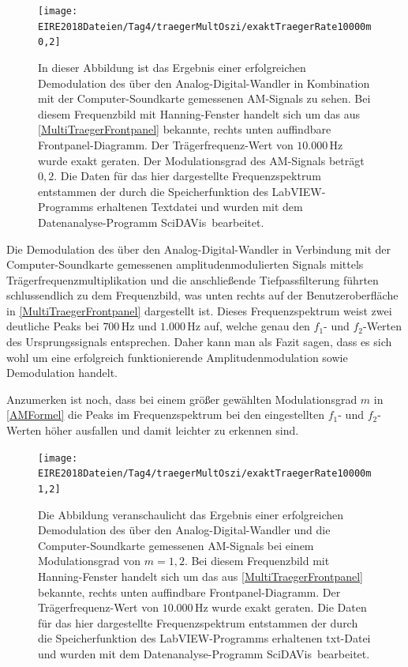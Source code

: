 \documentclass[
a4paper,
12pt,
pagesize,
ngerman
]{scrartcl}
\begin{document}
	\begin{figure}[H]
		\centering
		\texttt{[image: EIRE2018Dateien/Tag4/traegerMultOszi/exaktTraegerRate10000m0,2]}
		\caption{In dieser Abbildung ist das Ergebnis einer erfolgreichen Demodulation des über den Analog-Digital-Wandler in Kombination mit der Computer-Soundkarte gemessenen AM-Signals zu sehen. Bei diesem Frequenzbild mit Hanning-Fenster handelt sich um das aus \cref{MultiTraegerFrontpanel} bekannte, rechts unten auffindbare Frontpanel-Diagramm. Der Trägerfrequenz-Wert von $10.000\,$Hz wurde exakt geraten. Der Modulationsgrad des AM-Signals beträgt $0,2$. Die Daten für das hier dargestellte Frequenzspektrum entstammen der durch die Speicherfunktion des LabVIEW-Programms erhaltenen Textdatei und wurden mit dem Datenanalyse-Programm \glqq SciDAVis\grqq\ bearbeitet.}%
		\label{AMDemodsuccm02}
	\end{figure}

	\noindent Die Demodulation des über den Analog-Digital-Wandler in Verbindung mit der Computer-Soundkarte gemessenen amplitudenmodulierten Signals mittels Trägerfrequenzmultiplikation und die anschließende Tiefpassfilterung führten schlussendlich zu dem Frequenzbild, was unten rechts auf der Benutzeroberfläche in \cref{MultiTraegerFrontpanel} dargestellt ist.
	Dieses Frequenzspektrum weist zwei deutliche Peaks bei $700\,$Hz und $1.000\,$Hz auf, welche genau den $f_1$- und $f_2$-Werten des Ursprungssignals entsprechen. 
	Daher kann man als Fazit sagen, dass es sich wohl um eine erfolgreich funktionierende Amplitudenmodulation sowie Demodulation handelt. 
	
	Anzumerken ist noch, dass bei einem größer gewählten Modulationsgrad $m$ in \cref{AMFormel} die Peaks im Frequenzspektrum bei den eingestellten $f_1$- und $f_2$-Werten höher ausfallen und damit leichter zu erkennen sind. 
	
	\begin{figure}[H]
		\centering
		\texttt{[image: EIRE2018Dateien/Tag4/traegerMultOszi/exaktTraegerRate10000m1,2]}
		\caption{Die Abbildung veranschaulicht das Ergebnis einer erfolgreichen Demodulation des über den Analog-Digital-Wandler und die Computer-Soundkarte gemessenen AM-Signals bei einem Modulationsgrad von $m = 1,2$. Bei diesem Frequenzbild mit Hanning-Fenster handelt sich um das aus \cref{MultiTraegerFrontpanel} bekannte, rechts unten auffindbare Frontpanel-Diagramm. Der Trägerfrequenz-Wert von $10.000\,$Hz wurde exakt geraten. Die Daten für das hier dargestellte Frequenzspektrum entstammen der durch die Speicherfunktion des LabVIEW-Programms erhaltenen txt-Datei und wurden mit dem Datenanalyse-Programm \glqq SciDAVis\grqq\ bearbeitet.}
		\label{AMDemodsuccm12}
	\end{figure}
\end{document}
